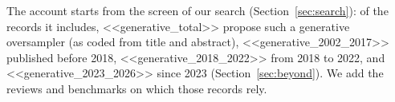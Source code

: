 The account starts from the screen of our search (Section~\ref{sec:search}): of the records it includes, <<generative_total>> propose such a generative oversampler (as coded from title and abstract), <<generative_2002_2017>> published before 2018, <<generative_2018_2022>> from 2018 to 2022, and <<generative_2023_2026>> since 2023 (Section~\ref{sec:beyond}). We add the reviews and benchmarks on which those records rely.
